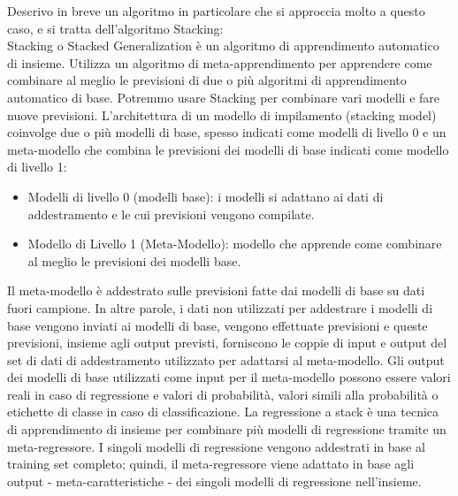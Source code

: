 \documentclass[12pt,a4paper]{report}
\begin{document}
Descrivo in breve un algoritmo in particolare che si approccia molto a questo caso, e si tratta dell'algoritmo Stacking:\\
Stacking o Stacked Generalization è un algoritmo di apprendimento automatico di insieme. Utilizza un algoritmo di meta-apprendimento per apprendere come combinare al meglio le previsioni di due o più algoritmi di apprendimento automatico di base.
Potremmo usare Stacking per combinare vari modelli e fare nuove previsioni.
L'architettura di un modello di impilamento (stacking model) coinvolge due o più modelli di base, spesso indicati come modelli di livello 0 e un meta-modello che combina le previsioni dei modelli di base indicati come modello di livello 1:
\begin{itemize}
    \item Modelli di livello 0 (modelli base): i modelli si adattano ai dati di addestramento e le cui previsioni vengono compilate.
    \item Modello di Livello 1 (Meta-Modello): modello che apprende come combinare al meglio le previsioni dei modelli base.
\end{itemize}
Il meta-modello è addestrato sulle previsioni fatte dai modelli di base su dati fuori campione. In altre parole, i dati non utilizzati per addestrare i modelli di base vengono inviati ai modelli di base, vengono effettuate previsioni e queste previsioni, insieme agli output previsti, forniscono le coppie di input e output del set di dati di addestramento utilizzato per adattarsi al meta-modello. Gli output dei modelli di base utilizzati come input per il meta-modello possono essere valori reali in caso di regressione e valori di probabilità, valori simili alla probabilità o etichette di classe in caso di classificazione.
La regressione a stack è una tecnica di apprendimento di insieme per combinare più modelli di regressione tramite un meta-regressore. I singoli modelli di regressione vengono addestrati in base al training set completo; quindi, il meta-regressore viene adattato in base agli output - meta-caratteristiche - dei singoli modelli di regressione nell'insieme.\\
\end{document}
